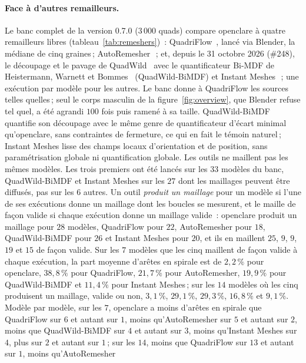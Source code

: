 \documentclass[11pt,a4paper]{article}
\begin{document}
\paragraph{Face à d'autres remailleurs.}
Le banc complet de la version 0.7.0 ($3\,000$ quads) compare openclare à
quatre remailleurs libres (tableau~\ref{tab:remeshers})~:
QuadriFlow~\cite{huang2018quadriflow}, lancé via Blender, la médiane de cinq
graines\,; AutoRemesher~\cite{autoremesher}\,; et, depuis le 31 octobre 2026
(\#248), le découpage et le pavage de QuadWild~\cite{pietroni2021reliable}
avec le quantificateur Bi-MDF de Heistermann, Warnett et
Bommes~\cite{heistermann2023bimdf} (QuadWild-BiMDF) et Instant
Meshes~\cite{jakob2015instant}\,; une exécution par modèle pour les autres.
Le banc donne à QuadriFlow les sources telles quelles\,; seul le corps
masculin de la figure~\ref{fig:overview}, que Blender refuse tel quel, a été
agrandi $100$ fois puis ramené à sa taille.
QuadWild-BiMDF quantifie son découpage avec le même genre de quantificateur
d'écart minimal qu'openclare, sans contraintes de fermeture, ce qui en fait
le témoin naturel\,; Instant Meshes lisse des champs locaux d'orientation et
de position, sans paramétrisation globale ni quantification globale. Les outils ne maillent pas les mêmes
modèles. Les trois premiers ont été lancés sur les $33$ modèles du banc,
QuadWild-BiMDF et Instant Meshes sur les $27$ dont les maillages peuvent être
diffusés, pas sur les $6$ autres. Un outil \emph{produit un maillage} pour un
modèle si l'une de ses exécutions donne un maillage dont les boucles se
mesurent, et le maille de façon valide si chaque exécution donne un maillage
valide~: openclare produit un maillage pour $28$ modèles, QuadriFlow pour
$22$, AutoRemesher pour $18$, QuadWild-BiMDF pour $26$ et Instant Meshes pour
$20$, et ils en maillent $25$, $9$, $9$, $19$ et $15$ de façon valide. Sur
les $7$ modèles que les cinq maillent de façon valide à chaque exécution, la
part moyenne d'arêtes en spirale est de $2,2\,\%$ pour openclare,
$38,8\,\%$ pour QuadriFlow, $21,7\,\%$ pour AutoRemesher, $19,9\,\%$ pour
QuadWild-BiMDF et $11,4\,\%$ pour Instant Meshes\,; sur les $14$ modèles où
les cinq produisent un maillage, valide ou non, $3,1\,\%$, $29,1\,\%$,
$29,3\,\%$, $16,8\,\%$ et $9,1\,\%$. Modèle par modèle, sur les $7$, openclare a moins d'arêtes en
spirale que QuadriFlow sur $6$ et autant sur $1$, moins qu'AutoRemesher sur
$5$ et autant sur $2$, moins que QuadWild-BiMDF sur $4$ et autant sur $3$,
moins qu'Instant Meshes sur $4$, plus sur $2$ et autant sur $1$\,; sur les
$14$, moins que QuadriFlow sur $13$ et autant sur $1$, moins qu'AutoRemesher
\end{document}
